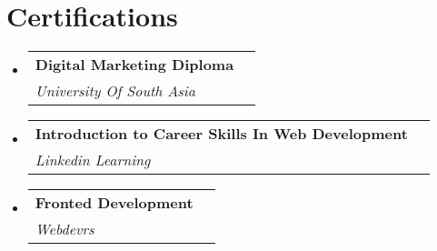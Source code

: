 \documentclass[letterpaper,11pt]{article}
\makeatletter
\newcommand{\resumeSubheading}[4]{
  \vspace{-2pt}\item
    \begin{tabular*}{0.97\textwidth}[t]{l@{\extracolsep{\fill}}r}
      \textbf{#1} & #2 \\
      \textit{\small#3} & \textit{\small #4} \\
    \end{tabular*}\vspace{-7pt}
}
\newcommand{\resumeSubHeadingListStart}{\begin{itemize}[leftmargin=0.15in, label={}]}
\newcommand{\resumeSubHeadingListEnd}{\end{itemize}}
\makeatother
\begin{document}
\section{Certifications}
  \resumeSubHeadingListStart
    \resumeSubheading
      {Digital Marketing Diploma}{}
      {University Of South Asia}{}
    \resumeSubheading
      {Introduction to Career Skills In Web Development}{}
      {Linkedin Learning}{}
    \resumeSubheading
      {Fronted Development}{}
      {Webdevrs}{}
  \resumeSubHeadingListEnd

\end{document}
